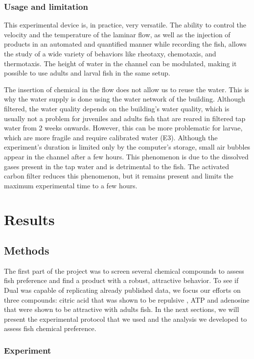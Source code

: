   \subsection{Usage and limitation}
  This experimental device is, in practice, very versatile. The ability to control the velocity and the temperature of the laminar flow, as well as the injection of products in an automated and quantified manner while recording the fish, allows the study of a wide variety of behaviors like rheotaxy, chemotaxis, and thermotaxis. The height of water in the channel can be modulated, making it possible to use adults and larval fish in the same setup.

  The insertion of chemical in the flow does not allow us to reuse the water. This is why the water supply is done using the water network of the building. Although filtered, the water quality depends on the building's water quality, which is usually not a problem for juveniles and adults fish that are reared in filtered tap water from 2 weeks onwards. However, this can be more problematic for larvae, which are more fragile and require calibrated water (E3). Although the experiment's duration is limited only by the computer's storage, small air bubbles appear in the channel after a few hours. This phenomenon is due to the dissolved gases present in the tap water and is detrimental to the fish. The activated carbon filter reduces this phenomenon, but it remains present and limits the maximum experimental time to a few hours.

\chapter{Results}
  \section{Methods}
  The first part of the project was to screen several chemical compounds to assess fish preference and find a product with a robust, attractive behavior. To see if Dual was capable of replicating already published data, we focus our efforts on three compounds: citric acid that was shown to be repulsive \cite{}, ATP and adenosine that were shown to be attractive \cite{} with adults fish. In the next sections, we will present the experimental protocol that we used and the analysis we developed to assess fish chemical preference.

  \subsection{Experiment}
